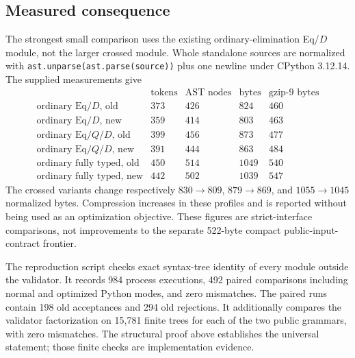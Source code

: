 \subsection{Measured consequence}

The strongest small comparison uses the existing ordinary-elimination
Eq/$D$ module, not the larger crossed module. Whole standalone sources
are normalized with \texttt{ast.unparse(ast.parse(source))} plus one
newline under CPython 3.12.14. The supplied measurements give
\[
\begin{array}{lrrrr}
 &\text{tokens}&\text{AST nodes}&\text{bytes}&\text{gzip-9 bytes}\\
\text{ordinary Eq/$D$, old}&373&426&824&460\\
\text{ordinary Eq/$D$, new}&359&414&803&463\\
\text{ordinary Eq/$Q$/$D$, old}&399&456&873&477\\
\text{ordinary Eq/$Q$/$D$, new}&391&444&863&484\\
\text{ordinary fully typed, old}&450&514&1049&540\\
\text{ordinary fully typed, new}&442&502&1039&547
\end{array}
\]
The crossed variants change respectively $830\to809$, $879\to869$,
and $1055\to1045$ normalized bytes. Compression increases in these
profiles and is reported without being used as an optimization objective.
These figures are strict-interface comparisons, not improvements to the
separate 522-byte compact public-input-contract frontier.

The reproduction script checks exact syntax-tree identity of every module
outside the validator. It records 984 process executions, 492 paired
comparisons including normal and optimized Python modes, and zero
mismatches. The paired runs contain 198 old acceptances and 294 old
rejections. It additionally compares the validator factorization on
15,781 finite trees for each of the two public grammars, with zero
mismatches. The structural proof above establishes the universal
statement; those finite checks are implementation evidence.
